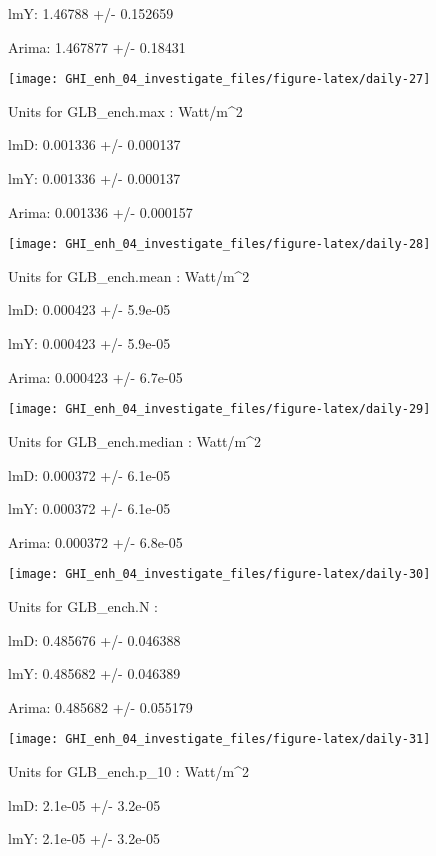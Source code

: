 \documentclass[
  10pt,
  a4paper,oneside]{article}
\begin{document}
lmY: 1.46788 +/- 0.152659

Arima: 1.467877 +/- 0.18431

\begin{center}\texttt{[image: GHI\_enh\_04\_investigate\_files/figure-latex/daily-27]} \end{center}

Units for GLB\_ench.max : Watt/m\^{}2

lmD: 0.001336 +/- 0.000137

lmY: 0.001336 +/- 0.000137

Arima: 0.001336 +/- 0.000157

\begin{center}\texttt{[image: GHI\_enh\_04\_investigate\_files/figure-latex/daily-28]} \end{center}

Units for GLB\_ench.mean : Watt/m\^{}2

lmD: 0.000423 +/- 5.9e-05

lmY: 0.000423 +/- 5.9e-05

Arima: 0.000423 +/- 6.7e-05

\begin{center}\texttt{[image: GHI\_enh\_04\_investigate\_files/figure-latex/daily-29]} \end{center}

Units for GLB\_ench.median : Watt/m\^{}2

lmD: 0.000372 +/- 6.1e-05

lmY: 0.000372 +/- 6.1e-05

Arima: 0.000372 +/- 6.8e-05

\begin{center}\texttt{[image: GHI\_enh\_04\_investigate\_files/figure-latex/daily-30]} \end{center}

Units for GLB\_ench.N :

lmD: 0.485676 +/- 0.046388

lmY: 0.485682 +/- 0.046389

Arima: 0.485682 +/- 0.055179

\begin{center}\texttt{[image: GHI\_enh\_04\_investigate\_files/figure-latex/daily-31]} \end{center}

Units for GLB\_ench.p\_10 : Watt/m\^{}2

lmD: 2.1e-05 +/- 3.2e-05

lmY: 2.1e-05 +/- 3.2e-05
\end{document}

